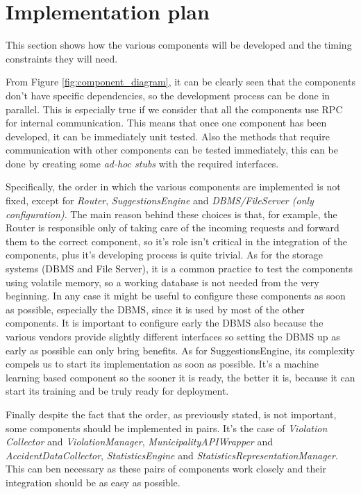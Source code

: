 \section{Implementation plan}
This section shows how the various components will be developed
and the timing constraints they will need. 

From Figure \ref{fig:component_diagram}, it can be clearly seen that the
components don't have specific dependencies, so the development process can be
done in parallel. This is especially true if we consider that all the components
use RPC for internal communication. This means that once one component has been
developed, it can be immediately unit tested. Also the methods that require
communication with other components can be tested immediately, this can be done
by creating some \emph{ad-hoc stubs} with the required interfaces.

Specifically, the order in which the various components are implemented is not
fixed, except for \emph{Router}, \emph{SuggestionsEngine} and
\emph{DBMS/FileServer (only configuration)}. The main reason behind these
choices is that, for example, the Router is responsible only of taking care of
the incoming requests and forward them to the correct component, so it's role
isn't critical in the integration of the components, plus it's developing
process is quite trivial. As for the storage systems (DBMS and File Server), it
is a common practice to test the components using volatile memory, so a working
database is not needed from the very beginning. In any case it might be useful
to configure these components as soon as possible, especially the DBMS, since it
is used by most of the other components. It is important to configure early the
DBMS also because the various vendors provide slightly different interfaces so
setting the DBMS up as early as possible can only bring benefits. As for
SuggestionsEngine, its complexity compels us to start its implementation as soon
as possible. It's a machine learning based component so the sooner it is ready,
the better it is, because it can start its training and be truly ready for
deployment.

Finally despite the fact that the order, as previously stated, is not important,
some components should be implemented in pairs. It's the case of \emph{Violation
Collector} and \emph{ViolationManager}, \emph{MunicipalityAPIWrapper} and
\emph{AccidentDataCollector}, \emph{StatisticsEngine} and
\emph{StatisticsRepresentationManager}. This can ben necessary as these pairs of
components work closely and their integration should be as easy as possible.